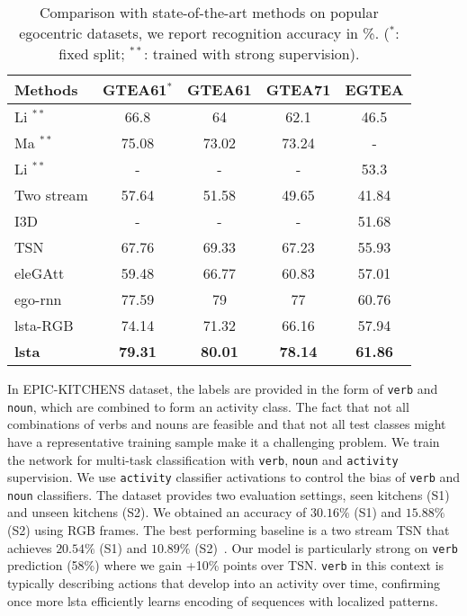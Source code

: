 \documentclass[10pt,twocolumn,letterpaper]{article}
\begin{document}
	\begin{table}[t]\small
		\begin{center}\setlength{\tabcolsep}{4pt} 
			\begin{tabular}{|l|c|c|c|c|}
				\hline
Methods & GTEA61$^*$ & GTEA61 & GTEA71 & EGTEA\\
\hline
				Li \etal \cite{li2015delving}$^{**}$ & 66.8 & 64 & 62.1 & 46.5 \\
				\hline
				Ma \etal \cite{ma2016deeper}$^{**}$ & 75.08 & 73.02 & 73.24 & - \\
				\hline
				Li \etal \cite{li2018eye}$^{**}$ & - & - & - & 53.3\\
				\hline
				Two stream \cite{simonyan2014two} & 57.64 & 51.58 & 49.65 & 41.84 \\
				\hline
				I3D \cite{carreira2017quo} & - & - & - & 51.68 \\
				\hline
				TSN \cite{TSN2016ECCV}  & 67.76 & 69.33 & 67.23 & 55.93 \\ 
				\hline
				eleGAtt \cite{attention_eccv18} & 59.48 & 66.77 & 60.83 & 57.01 \\
\hline
				ego-rnn \cite{sudhakaran2018attention} & 77.59 & 79 & 77 & 60.76 \\
				\hline
				\ac{lsta}-RGB & 74.14 & 71.32 & 66.16
 & 57.94 \\
				\hline
				\textbf{\ac{lsta}} & \textbf{79.31} & \textbf{80.01} & \textbf{78.14} & \textbf{61.86} \\
				\hline
			\end{tabular}
		\end{center}
		\vspace{-0.6cm}
		\caption{Comparison with state-of-the-art methods on popular egocentric datasets, we report recognition accuracy in \%. ($^*$: fixed split; $^{**}$: trained with strong supervision).}
		\label{tab:res_table}\vspace{-0.5cm}
	\end{table}
	
	
In EPIC-KITCHENS dataset, the labels are provided in the form of \verb+verb+ and \verb+noun+, which are combined to form an activity class. The fact that not all combinations of verbs and nouns are feasible and that not all test classes might have a representative training sample make it a challenging problem. We train the network for multi-task classification with \verb+verb+, \verb+noun+ and \verb+activity+ supervision. We use \verb+activity+ classifier activations to control the bias of \verb+verb+ and \verb+noun+ classifiers. The dataset provides two evaluation settings, seen kitchens (S1) and unseen kitchens (S2). We obtained an accuracy of $30.16\%$ (S1) and $15.88\%$ (S2) using RGB frames. The best performing baseline is a two stream TSN that achieves $20.54\%$ (S1) and $10.89\%$ (S2)~\cite{Damen_2018_ECCV}. Our model is particularly strong on \verb+verb+ prediction (58\%) where we gain +10\% points over TSN. \verb+verb+ in this context is typically describing actions that develop into an activity over time, confirming once more \ac{lsta} efficiently learns encoding of sequences with localized patterns. 
\end{document}

